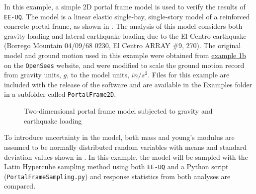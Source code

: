 In this example, a simple 2D portal frame model is used to verify the
results of \texttt{EE-UQ}. The model is a linear elastic single-bay,
single-story model of a reinforced concrete portal frame, as shown in
. The analysis of this model considers both
gravity loading and lateral earthquake loading due to the El Centro
earthquake (Borrego Mountain 04/09/68 0230, El Centro ARRAY \#9, 270).
The original model and ground motion used in this example were
obtained from
\href{http://opensees.berkeley.edu/wiki/index.php/OpenSees_Example_1b._Elastic_Portal_Frame}{example 1b} on the \texttt{OpenSees} website, 
and were modified to scale the ground motion record from gravity
units, $g$, to the model units, $in/s^2$. Files for this example are
included with the release of the software and are available in the
Examples folder in a subfolder called \texttt{PortalFrame2D}.

\begin{figure}[!htbp]
  \caption{Two-dimensional portal frame model subjected to gravity and earthquake loading}
  \label{fig:figure20}
\end{figure}

To introduce uncertainty in the model, both mass and young’s modulus
are assumed to be normally distributed random variables with means and
standard deviation values shown in . In this
example, the model will be sampled with the Latin Hypercube sampling
method using both \texttt{EE-UQ} and a Python script
(\texttt{PortalFrameSampling.py}) and response statistics from both
analyses are compared.

